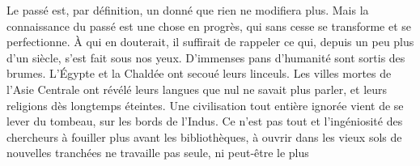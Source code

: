 \documentclass[french,twoside]{book} %
\newcommand{\astermono}{\medskip\centerline{\color{rubric}\large\selectfont{\syms ✻}}\medskip\par}%
\begin{document}
\astermono

\noindent Le passé est, par définition, un donné que rien ne modifiera plus. Mais la connaissance du passé est une chose en progrès, qui sans cesse se transforme et se perfectionne. À qui en douterait, il suffirait de rap­peler ce qui, depuis un peu plus d’un siècle, s’est fait sous nos yeux. D’im­menses pans d’humanité sont sortis des brumes. L’Égypte et la Chaldée ont secoué leurs linceuls. Les villes mortes de l’Asie Centrale ont révélé leurs langues que nul ne savait plus parler, et leurs religions dès longtemps éteintes. Une civilisation tout entière ignorée vient de se lever du tom­beau, sur les bords de l’Indus. Ce n’est pas tout et l’ingéniosité des cher­cheurs à fouiller plus avant les bibliothèques, à ouvrir dans les vieux sols de nouvelles tranchées ne travaille pas seule, ni peut‑être le plus  
\end{document}
